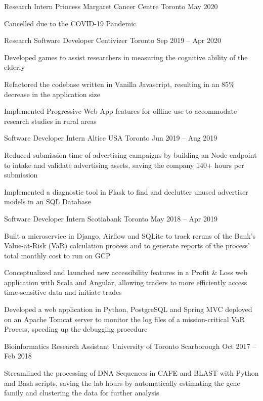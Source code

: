 \begin{cventries}
  \cventry
    {Research Intern}
    {Princess Margaret Cancer Centre}
    {Toronto}
    {May 2020}
    {}
    {
      \begin{cvitems}
        \item {Cancelled due to the COVID-19 Pandemic}
      \end{cvitems}
    }
  \cventry
    {Research Software Developer}
    {Centivizer}
    {Toronto}
    {Sep 2019 -- Apr 2020}
    {}
    {
      \begin{cvitems}
        \item {Developed games to assist researchers in measuring the cognitive ability of the elderly}
        \item {Refactored the codebase written in Vanilla Javascript, resulting in an 85\% decrease in the application size}
        \item {Implemented Progressive Web App features for offline use to accommodate research studies in rural areas}
      \end{cvitems}
    }
  \cventry
    {Software Developer Intern}
    {Altice USA}
    {Toronto}
    {Jun 2019 -- Aug 2019}
    {}
    {
    \begin{cvitems}
      \item {Reduced submission time of advertising campaigns by building an Node endpoint to intake and validate advertising assets, saving the company 140+ hours per submission}
      \item {Implemented a diagnostic tool in Flask to find and declutter unused advertiser models in an SQL Database}
    \end{cvitems}
    }
  \cventry
    {Software Developer Intern}
    {Scotiabank}
    {Toronto}
    {May 2018 -- Apr 2019}
    {}
    {
      \begin{cvitems}
        \item {Built a microservice in Django, Airflow and SQLite to track reruns of the Bank's Value-at-Risk (VaR) calculation process and to generate reports of the process' total monthly cost to run on GCP}
        \item {Conceptualized and launched new accessibility features in a Profit \& Loss web application with Scala and Angular, allowing traders to more efficiently access time-sensitive data and initiate trades}
        \item {Developed a web application in Python, PostgreSQL and Spring MVC deployed on an Apache Tomcat server to monitor the log files of a mission-critical VaR Process, speeding up the debugging procedure}
      \end{cvitems}
    }
  
  \cventry
    {Bioinformatics Research Assistant}
    {University of Toronto}
    {Scarborough}
    {Oct 2017 -- Feb 2018}
    {}
    {
      \begin{cvitems}
        \item {Streamlined the processing of DNA Sequences in CAFE and BLAST with Python and Bash scripts, saving the lab hours by automatically estimating the gene family and clustering the data for further analysis}
      \end{cvitems}
    }
\end{cventries}
